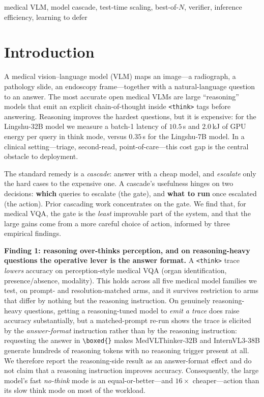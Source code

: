 \documentclass[conference]{IEEEtran}
\begin{document}
\begin{abstract}
\end{abstract}

\begin{IEEEkeywords}
medical VLM, model cascade, test-time scaling, best-of-$N$, verifier, inference efficiency, learning to defer
\end{IEEEkeywords}

\section{Introduction}
A medical vision--language model (VLM) maps an image---a radiograph, a pathology slide, an endoscopy frame---together with a natural-language question to an answer. The most accurate open medical VLMs are large ``reasoning'' models that emit an explicit chain-of-thought inside \texttt{<think>} tags before answering. Reasoning improves the hardest questions, but it is expensive: for the Lingshu-32B model we measure a batch-1 latency of $10.5$\,s and $2.0$\,kJ of GPU energy per query in think mode, versus $0.35$\,s for the Lingshu-7B model. In a clinical setting---triage, second-read, point-of-care---this cost gap is the central obstacle to deployment.

The standard remedy is a \emph{cascade}: answer with a cheap model, and \emph{escalate} only the hard cases to the expensive one. A cascade's usefulness hinges on two decisions: \textbf{which} queries to escalate (the gate), and \textbf{what to run} once escalated (the action). Prior cascading work concentrates on the gate. We find that, for medical VQA, the gate is the \emph{least} improvable part of the system, and that the large gains come from a more careful choice of action, informed by three empirical findings.

\textbf{Finding 1: reasoning over-thinks perception, and on reasoning-heavy questions the operative lever is the answer format.} A \texttt{<think>} trace \emph{lowers} accuracy on perception-style medical VQA (organ identification, presence/absence, modality). This holds across all five medical model families we test, on prompt- and resolution-matched arms, and it survives restriction to arms that differ by nothing but the reasoning instruction. On genuinely reasoning-heavy questions, getting a reasoning-tuned model to \emph{emit a trace} does raise accuracy substantially, but a matched-prompt re-run shows the trace is elicited by the \emph{answer-format} instruction rather than by the reasoning instruction: requesting the answer in \texttt{\textbackslash boxed\{\}} makes MedVLThinker-32B and InternVL3-38B generate hundreds of reasoning tokens with no reasoning trigger present at all. We therefore report the reasoning-side result as an answer-format effect and do not claim that a reasoning instruction improves accuracy. Consequently, the large model's fast \emph{no-think} mode is an equal-or-better---and $16{\times}$ cheaper---action than its slow think mode on most of the workload.
\end{document}
